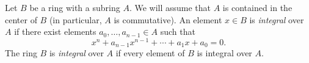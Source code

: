 \documentclass[12pt]{article}
\begin{document}
Let $B$ be a ring with a subring $A$. We will assume that $A$ is contained in the center of $B$ (in particular, $A$ is commutative). An element $x \in B$ is \emph{integral} over $A$ if there exist elements $a_0, \dots, a_{n-1} \in A$ such that
$$
x^n + a_{n-1} x^{n-1} + \cdots + a_1 x + a_0 = 0.
$$
The ring $B$ is \emph{integral} over $A$ if every element of $B$ is integral over $A$.
\end{document}
